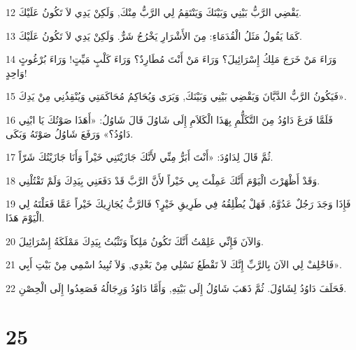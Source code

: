 \par 12 يَقْضِي الرَّبُّ بَيْنِي وَبَيْنَكَ وَيَنْتَقِمُ لِي الرَّبُّ مِنْكَ, وَلَكِنْ يَدِي لاَ تَكُونُ عَلَيْكَ.
\par 13 كَمَا يَقُولُ مَثَلُ الْقُدَمَاءِ: مِنَ الأَشْرَارِ يَخْرُجُ شَرٌّ. وَلَكِنْ يَدِي لاَ تَكُونُ عَلَيْكَ.
\par 14 وَرَاءَ مَنْ خَرَجَ مَلِكُ إِسْرَائِيلَ؟ وَرَاءَ مَنْ أَنْتَ مُطَارِدٌ؟ وَرَاءَ كَلْبٍ مَيِّتٍ! وَرَاءَ بُرْغُوثٍ وَاحِدٍ!
\par 15 فَيَكُونُ الرَّبُّ الدَّيَّانَ وَيَقْضِي بَيْنِي وَبَيْنَكَ, وَيَرَى وَيُحَاكِمُ مُحَاكَمَتِي وَيُنْقِذُنِي مِنْ يَدِكَ».
\par 16 فَلَمَّا فَرَغَ دَاوُدُ مِنَ التَّكَلُّمِ بِهَذَا الْكَلاَمِ إِلَى شَاوُلَ قَالَ شَاوُلُ: «أَهَذَا صَوْتُكَ يَا ابْنِي دَاوُدُ؟» وَرَفَعَ شَاوُلُ صَوْتَهُ وَبَكَى.
\par 17 ثُمَّ قَالَ لِدَاوُدَ: «أَنْتَ أَبَرُّ مِنِّي لأَنَّكَ جَازَيْتَنِي خَيْراً وَأَنَا جَازَيْتُكَ شَرّاً.
\par 18 وَقَدْ أَظْهَرْتَ الْيَوْمَ أَنَّكَ عَمِلْتَ بِي خَيْراً لأَنَّ الرَّبَّ قَدْ دَفَعَنِي بِيَدِكَ وَلَمْ تَقْتُلْنِي.
\par 19 فَإِذَا وَجَدَ رَجُلٌ عَدُوَّهُ, فَهَلْ يُطْلِقُهُ فِي طَرِيقِ خَيْرٍ؟ فَالرَّبُّ يُجَازِيكَ خَيْراً عَمَّا فَعَلْتَهُ لِي الْيَوْمَ هَذَا.
\par 20 وَالآنَ فَإِنِّي عَلِمْتُ أَنَّكَ تَكُونُ مَلِكاً وَتَثْبُتُ بِيَدِكَ مَمْلَكَةُ إِسْرَائِيلَ.
\par 21 فَاحْلِفْ لِي الآنَ بِالرَّبِّ إِنَّكَ لاَ تَقْطَعُ نَسْلِي مِنْ بَعْدِي, وَلاَ تُبِيدُ اسْمِي مِنْ بَيْتِ أَبِي».
\par 22 فَحَلَفَ دَاوُدُ لِشَاوُلَ. ثُمَّ ذَهَبَ شَاوُلُ إِلَى بَيْتِهِ, وَأَمَّا دَاوُدُ وَرِجَالُهُ فَصَعِدُوا إِلَى الْحِصْنِ.

\chapter{25}

